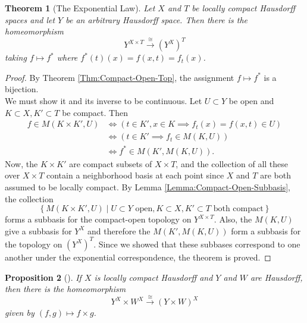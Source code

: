 \documentclass[reqno]{amsart}
\newtheorem{theorem}{Theorem}[section]
\newtheorem{proposition}[theorem]{Proposition}
\theoremstyle{definition}
\theoremstyle{remark}
\begin{document}
\begin{theorem}[The Exponential Law]
    Let $X$ and $T$ be locally compact Hausdorff spaces
    and let $Y$ be an arbitrary Hausdorff space. Then
    there is the homeomorphism
    \[
    Y^{X \times T} \stackrel{\cong}{\to} \left( Y^{X} \right)^{T}
    \] 
    taking $f \mapsto f^{*}$ where
    $f^{*}(t) (x) = f(x,t) = f_t(x)$.
\end{theorem}

\begin{proof}
    By Theorem \ref{Thm:Compact-Open-Top}, the assignment
    $f \mapsto f^{*}$ is a bijection.\\
    We must show it and its inverse to be continuous.
    Let $U \subset Y$ be open and
    $K \subset X, K'\subset T$ be compact. Then
    \begin{align*}
        f \in M \left( K \times K', U \right) 
        &\iff \left( t \in K', x \in K
        \implies f_t(x) = f(x,t) \in U \right) \\
        &\iff \left( t \in K' \implies 
        f_t \in M \left( K, U \right) \right) \\
        &\iff f^{*} \in M \left( K', M\left( K ,U \right)  \right).
    \end{align*}
    Now, the $K \times K'$ are compact
    subsets of $X \times T$, and the collection
    of all these over $X \times T$ contain
    a neighborhood basis at each point since
    $X$ and $T$ are both assumed to be locally compact.
    By Lemma \ref{Lemma:Compact-Open-Subbasis},
    the collection
    \[
        \left\{ M\left( K \times K', U \right) 
     \mid U \subset Y \text{ open}, 
 K \subset X, K' \subset T \text{ both compact}\right\} 
\]
forms a subbasis for the compact-open topology on
$Y^{X \times T}$. Also, the
$M\left( K, U \right)  $ give a subbasis for
$Y^{X}$ and therefore the
$M \left( K', M\left( K,U \right)  \right) $ form
a subbasis for the topology on
$\left( Y^{X} \right)^{T}$.
Since we showed that these subbases correspond to one
another under the exponential correspondence, the
theorem is proved.
\end{proof}

\begin{proposition}[]
    If $X$ is locally compact Hausdorff and $Y$ and $W$ are
    Hausdorff, then there is the homeomorphism
    \[
    Y^{X} \times W^{X}
    \stackrel{\cong}{\to} \left( Y \times W \right)^{X}
    \] 
    given by $\left( f,g \right) \mapsto 
    f \times g$.
\end{proposition}
\end{document}

